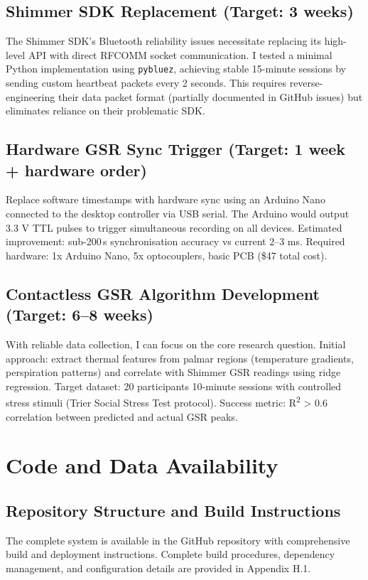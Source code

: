 \subsection{Shimmer SDK Replacement (Target: 3 weeks)}
The Shimmer SDK's Bluetooth reliability issues necessitate replacing its high-level API with direct RFCOMM socket communication. I tested a minimal Python implementation using \texttt{pybluez}, achieving stable 15-minute sessions by sending custom heartbeat packets every 2 seconds. This requires reverse-engineering their data packet format (partially documented in GitHub issues) but eliminates reliance on their problematic SDK.

\subsection{Hardware GSR Sync Trigger (Target: 1 week + hardware order)}
Replace software timestamps with hardware sync using an Arduino Nano connected to the desktop controller via USB serial. The Arduino would output 3.3 V TTL pulses to trigger simultaneous recording on all devices. Estimated improvement: sub-200\,\textmu s synchronisation accuracy vs current 2--3 ms. Required hardware: 1x Arduino Nano, 5x optocouplers, basic PCB (\$47 total cost).

\subsection{Contactless GSR Algorithm Development (Target: 6--8 weeks)}
With reliable data collection, I can focus on the core research question. Initial approach: extract thermal features from palmar regions (temperature gradients, perspiration patterns) and correlate with Shimmer GSR readings using ridge regression. Target dataset: 20 participants \texttimes{} 10-minute sessions with controlled stress stimuli (Trier Social Stress Test protocol). Success metric: R\textsuperscript{2} \textgreater{} 0.6 correlation between predicted and actual GSR peaks.

\section{Code and Data Availability}

\subsection{Repository Structure and Build Instructions}
The complete system is available in the GitHub repository with comprehensive build and deployment instructions. Complete build procedures, dependency management, and configuration details are provided in Appendix H.1.

